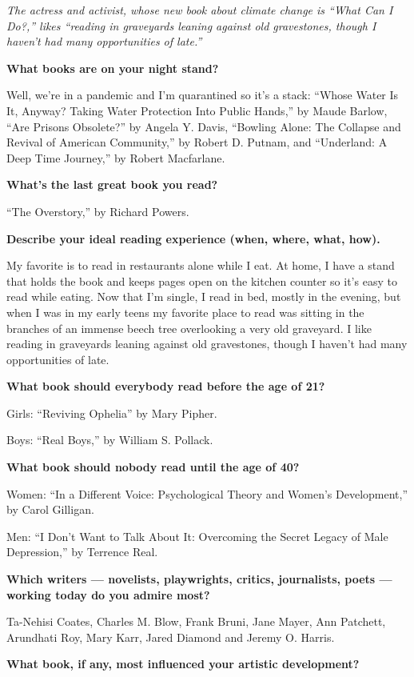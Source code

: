 \emph{The actress and activist, whose new book about climate change is
``What Can I Do?,'' likes ``reading in graveyards leaning against old
gravestones, though I haven't had many opportunities of late.''}

\textbf{What books are on your night stand?}

Well, we're in a pandemic and I'm quarantined so it's a stack: ``Whose
Water Is It, Anyway? Taking Water Protection Into Public Hands,'' by
Maude Barlow, ``Are Prisons Obsolete?'' by Angela Y. Davis, ``Bowling
Alone: The Collapse and Revival of American Community,'' by Robert D.
Putnam, and ``Underland: A Deep Time Journey,'' by Robert Macfarlane.

\textbf{What's the last great book you read?}

``The Overstory,'' by Richard Powers.

\textbf{Describe your ideal reading experience (when, where, what,
how).}

My favorite is to read in restaurants alone while I eat. At home, I have
a stand that holds the book and keeps pages open on the kitchen counter
so it's easy to read while eating. Now that I'm single, I read in bed,
mostly in the evening, but when I was in my early teens my favorite
place to read was sitting in the branches of an immense beech tree
overlooking a very old graveyard. I like reading in graveyards leaning
against old gravestones, though I haven't had many opportunities of
late.

\textbf{What book should everybody read before the age of 21?}

Girls: ``Reviving Ophelia'' by Mary Pipher.

Boys: ``Real Boys,'' by William S. Pollack.

\textbf{What book should nobody read until the age of 40?}

Women: ``In a Different Voice: Psychological Theory and Women's
Development,'' by Carol Gilligan.

Men: ``I Don't Want to Talk About It: Overcoming the Secret Legacy of
Male Depression,'' by Terrence Real.

\textbf{Which writers --- novelists, playwrights, critics, journalists,
poets --- working today do you admire most?}

Ta-Nehisi Coates, Charles M. Blow, Frank Bruni, Jane Mayer, Ann
Patchett, Arundhati Roy, Mary Karr, Jared Diamond and Jeremy O. Harris.

\textbf{What book, if any, most influenced your artistic development?}

